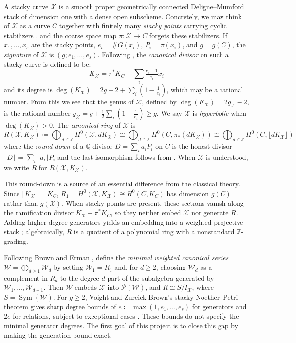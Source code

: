 \documentclass[11pt,reqno]{amsart}
\theoremstyle{remark}
\newcommand{\Sym}{\operatorname{Sym}} %
\newcommand{\defi}[1]{\textsf{#1}} %
\newcommand{\QQ}{\mathbb{Q}}
\newcommand{\ZZ}{\mathbb{Z}}
\newcommand{\cP}{\mathcal{P}}
\newcommand{\cW}{\mathcal{W}}
\newcommand{\cX}{\mathcal{X}}
\begin{document}
A \defi{stacky curve} $\cX$ is a smooth proper geometrically connected Deligne--Mumford stack of dimension one with a dense open subscheme. Concretely, we may think of $\cX$ as a curve $C$ together with finitely many \emph{stacky points} carrying cyclic stabilizers \cite[Lem.~5.3.10]{voightZurieckBrown22}, and the coarse space map $\pi\colon \cX \to C$ forgets these stabilizers. If $x_1,\ldots,x_s$ are the stacky points, $e_i = \#G(x_i)$, $P_i = \pi(x_i)$, and $g = g(C)$, the \emph{signature} of $\cX$ is $(g;e_1,\ldots,e_s)$. Following \cite{voightZurieckBrown22}, the \emph{canonical divisor} on such a stacky curve is defined to be:
\begin{equation}\label{eq:floor}
	K_{\cX}=\pi^*K_C+\sum_{i}\tfrac{e_i-1}{e_i}x_i
\end{equation}
and its degree is $\deg(K_{\cX}) = 2g-2+\sum_i(1-\tfrac1{e_i})$, which may be a rational number. From this we see that the genus of $\cX$, defined by $\deg(K_{\cX}) = 2g_{\cX}-2$, is the rational number $g_{\cX} = g+\tfrac{1}{2}\sum_i(1-\tfrac{1}{e_i})\geq g$. We say $\cX$ is \emph{hyperbolic} when $\deg(K_{\cX})>0$. The \emph{canonical ring} of $\cX$ is
\[
R\left(\cX,K_{\cX}\right) \coloneqq \bigoplus_{d\in \ZZ} H^0\left(\cX, dK_{\cX}\right) \cong \bigoplus_{d\in \ZZ} H^0\left(C, \pi_*(dK_{\cX})\right)  \cong \bigoplus_{d\in \ZZ} H^0\left(C, \lfloor dK_{\cX} \rfloor\right) 
\]
where  the \emph{round down} of a $\QQ$-divisor $D=\sum_i a_iP_i$ on $C$ is the honest divisor $\lfloor D\rfloor \coloneqq \sum_i \lfloor a_i\rfloor P_i$ and the  last isomorphism follows from  \cite[\S5.4]{voightZurieckBrown22}. When $\cX$ is understood, we write $R$ for $R(\cX, K_{\cX})$. 


This round-down is a source of an essential difference from the classical theory. Since $\lfloor K_{\cX}\rfloor=K_C$, $R_1=H^0(\cX,K_{\cX})\cong H^0(C,K_C)$ has dimension $g(C)$ rather than $g(\cX)$. When stacky points are present, these sections vanish along the ramification divisor $K_{\cX}-\pi^*K_C$, so they neither embed $\cX$ nor generate $R$. Adding higher-degree generators yields an embedding into a weighted projective stack \cite{braggOlssonWebb24}; algebraically, $R$ is a quotient of a polynomial ring with a nonstandard $\ZZ$-grading.

Following Brown and Erman \cite[\S2]{brownErman25}, define the \emph{minimal weighted canonical series} $\cW=\bigoplus_{d\geq1}\cW_d$ by setting $\cW_1=R_1$ and, for $d\geq2$, choosing $\cW_d$ as a complement in $R_d$ to the degree-$d$ part of the subalgebra generated by $\cW_1,\ldots,\cW_{d-1}$. Then $\cW$ embeds $\cX$ into $\cP(\cW)$, and $R\cong S/I_{\cX}$, where $S=\Sym(\cW)$. For $g\geq2$, Voight and Zureick-Brown's stacky Noether--Petri theorem gives sharp degree bounds of $e\coloneqq\max(1,e_1,\ldots,e_s)$ for generators and $2e$ for relations, subject to exceptional cases \cite[Cor.~1.4.2]{voightZurieckBrown22}. These bounds do not specify the minimal generator degrees. The first goal of this project is to close this gap by making the generation bound exact.
\end{document}
